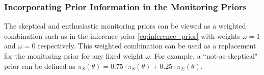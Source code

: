 \documentclass[12pt]{article}
\begin{document}
%

\subsubsection{Incorporating Prior Information in the Monitoring Priors}
The skeptical and enthusiastic monitoring priors can be viewed as a weighted combination such as in the inference prior \eqref{eq:inference_prior} with weights $\omega=1$ and $\omega=0$ respectively. This weighted combination can be used as a replacement for the monitoring prior for any fixed weight $\omega$. For example, a ``not-as-skeptical" prior can be defined as $\tilde{\pi_S}(\theta)=0.75\cdot\pi_S(\theta)+0.25\cdot\pi_E(\theta)$. 
\end{document}

